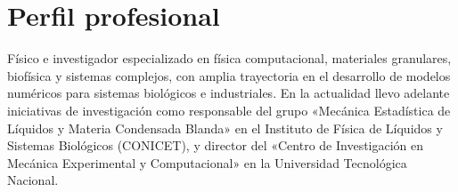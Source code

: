 \hrulefill \vspace{-1.5em}
\section*{Perfil profesional}

Físico e investigador especializado en física computacional, materiales granulares, biofísica y sistemas complejos, con amplia trayectoria en el desarrollo de modelos numéricos para sistemas  biológicos e industriales. En la actualidad llevo adelante iniciativas de investigación como responsable del grupo «Mecánica Estadística de Líquidos y Materia Condensada Blanda» en el Instituto de Física de Líquidos y Sistemas Biológicos (CONICET), y director del «Centro de Investigación en Mecánica Experimental y Computacional» en la Universidad Tecnológica Nacional.
